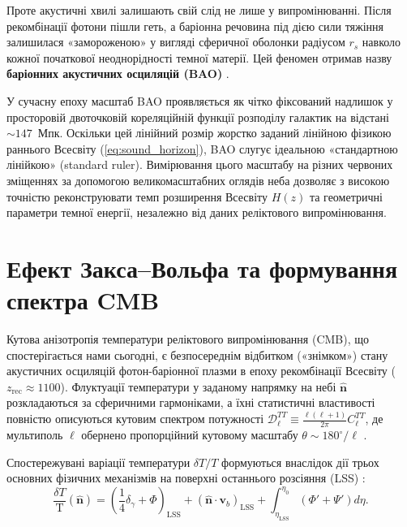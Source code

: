 \documentclass[12pt, a4paper]{article}
\begin{document}
Проте акустичні хвилі залишають свій слід не лише у випромінюванні. Після рекомбінації фотони пішли геть, а баріонна речовина під дією сили тяжіння залишилася «замороженою» у вигляді сферичної оболонки радіусом $r_s$ навколо кожної початкової неоднорідності темної матерії. Цей феномен отримав назву \textbf{баріонних акустичних осциляцій (BAO)} \cite{eisenstein_2005}.

У сучасну епоху масштаб BAO проявляється як чітко фіксований надлишок у просторовій двоточковій кореляційній функції розподілу галактик на відстані $\sim 147$~Мпк. Оскільки цей лінійний розмір жорстко заданий лінійною фізикою раннього Всесвіту (\ref{eq:sound_horizon}), BAO слугує ідеальною «стандартною лінійкою» (standard ruler). Вимірювання цього масштабу на різних червоних зміщеннях за допомогою великомасштабних оглядів неба дозволяє з високою точністю реконструювати темп розширення Всесвіту $H(z)$ та геометричні параметри темної енергії, незалежно від даних реліктового випромінювання.

\section{Ефект Закса--Вольфа та формування спектра CMB}

Кутова анізотропія температури реліктового випромінювання (CMB), що спостерігається нами сьогодні, є безпосереднім відбитком («знімком») стану акустичних осциляцій фотон-баріонної плазми в епоху рекомбінації Всесвіту ($z_{\mathrm{rec}} \approx 1100$). Флуктуації температури у заданому напрямку на небі $\hat{\mathbf{n}}$ розкладаються за сферичними гармоніками, а їхні статистичні властивості повністю описуються кутовим спектром потужності $\mathcal{D}_\ell^{TT} \equiv \frac{\ell(\ell+1)}{2\pi}C_\ell^{TT}$, де мультиполь $\ell$ обернено пропорційний кутовому масштабу $\theta \sim 180^\circ / \ell$ \cite{dodelson_2020}.

Спостережувані варіації температури $\delta T / T$ формуються внаслідок дії трьох основних фізичних механізмів на поверхні останнього розсіяння (LSS) \cite{hu_sugiyama_1995}:
\begin{equation}\label{eq:cmb_sources}
  \frac{\delta T}{\text{T}}(\hat{\mathbf{n}}) = \left( \frac{1}{4}\delta_\gamma + \Phi \right)_{\mathrm{LSS}} + \left( \hat{\mathbf{n}} \cdot \mathbf{v}_b \right)_{\mathrm{LSS}} + \int_{\eta_{\mathrm{LSS}}}^{\eta_0} \left( \Phi' + \Psi' \right) d\eta.
\end{equation}
\end{document}
